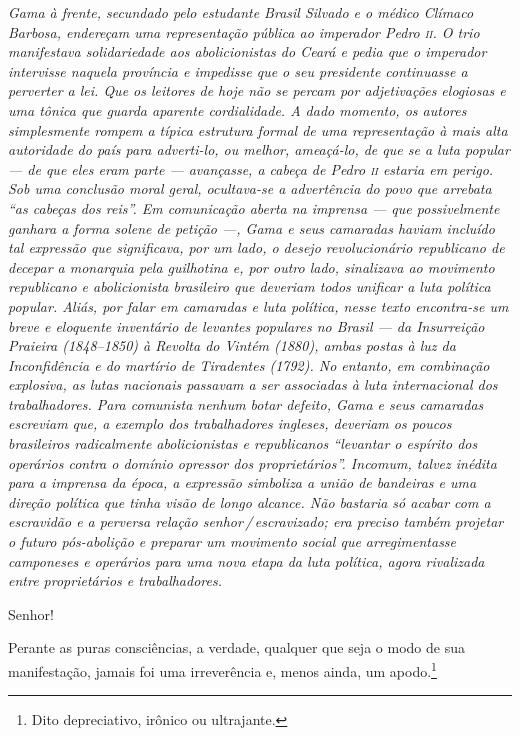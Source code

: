 \begin{resumo}
\emph{Gama à frente, secundado pelo estudante
Brasil Silvado e o médico Clímaco Barbosa, endereçam uma representação
pública ao imperador Pedro \textsc{ii}. O trio manifestava solidariedade aos
abolicionistas do Ceará e pedia que o imperador intervisse naquela província
e impedisse que o seu presidente continuasse a perverter a lei.
Que os leitores de hoje não se
percam por adjetivações elogiosas e uma tônica que guarda aparente
cordialidade. A dado momento, os autores simplesmente rompem a típica
estrutura formal de uma representação à mais alta autoridade do
país para adverti-lo, ou melhor, ameaçá-lo, de que se a luta popular ---
de que eles eram parte --- avançasse, a cabeça de Pedro \textsc{ii} estaria em
perigo. Sob uma conclusão moral geral, ocultava-se a advertência do povo que arrebata
``as cabeças dos reis''. Em comunicação
aberta na imprensa --- que possivelmente ganhara a forma solene
de petição ---, Gama e seus camaradas haviam incluído tal expressão que
significava, por um lado, o desejo revolucionário republicano de decepar
a monarquia pela guilhotina e, por outro lado, sinalizava ao movimento republicano e
abolicionista brasileiro que deveriam todos unificar a luta política
popular. Aliás, por falar em camaradas e luta política, nesse texto
encontra-se um breve e eloquente inventário de levantes populares no
Brasil --- da Insurreição Praieira (1848--1850) à Revolta do Vintém
(1880), ambas postas à luz da Inconfidência e do martírio de Tiradentes
(1792). No entanto, em combinação explosiva, as lutas nacionais passavam
a ser associadas à luta internacional dos trabalhadores. Para comunista
nenhum botar defeito, Gama e seus camaradas escreviam que, a exemplo dos
trabalhadores ingleses, deveriam os poucos brasileiros radicalmente
abolicionistas e republicanos ``levantar o espírito dos operários contra
o domínio opressor dos proprietários''. Incomum, talvez inédita para a
imprensa da época, a expressão simboliza a união de bandeiras e uma
direção política que tinha visão de longo alcance. Não bastaria só
acabar com a escravidão e a perversa relação senhor\,/\,escravizado; era
preciso também projetar o futuro pós-abolição e preparar um movimento
social que arregimentasse camponeses e operários para uma nova etapa da
luta política, agora rivalizada entre proprietários e trabalhadores. }
\end{resumo}

Senhor!

Perante as puras consciências, a verdade, qualquer que seja o modo de
sua manifestação, jamais foi uma irreverência e, menos ainda, um
apodo.\footnote{Dito depreciativo, irônico ou ultrajante.}

